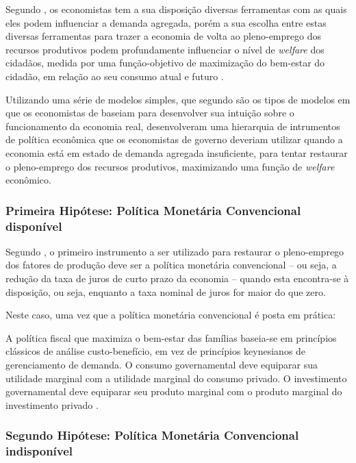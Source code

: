 \documentclass[
	10pt,				%
	openright,			%
	twoside,			%
	a5paper,			%
	english,			%
	french,				%
	spanish,			%
	brazil				%
	]{abntex2}
\renewenvironment{quote}
  {\small\list{}{\rightmargin=0.1cm \leftmargin=4cm}%
   \item\relax}
  {\endlist}
\begin{document}
Segundo , os economistas tem a sua
disposição diversas ferramentas com as quais eles podem influenciar a
demanda agregada, porém a sua escolha entre estas diversas ferramentas
para trazer a economia de volta ao pleno-emprego dos recursos produtivos
podem profundamente influenciar o nível de \emph{welfare} dos cidadãos,
medida por uma função-objetivo de maximização do bem-estar do cidadão,
em relação ao seu consumo atual e futuro \cite[p.~6]{mankiw2011}.

Utilizando uma série de modelos simples, que segundo
 são os tipos de modelos em que os
economistas de baseiam para desenvolver sua intuição sobre o
funcionamento da economia real, 
desenvolveram uma hierarquia de intrumentos de política econômica que os
economistas de governo deveriam utilizar quando a economia está em
estado de demanda agregada insuficiente, para tentar restaurar o
pleno-emprego dos recursos produtivos, maximizando uma função de
\emph{welfare} econômico.

\subsubsection{Primeira Hipótese: Política Monetária Convencional
disponível}\label{primeira-hipuxf3tese-poluxedtica-monetuxe1ria-convencional-disponuxedvel}

Segundo , o primeiro instrumento a ser
utilizado para restaurar o pleno-emprego dos fatores de produção deve
ser a política monetária convencional -- ou seja, a redução da taxa de
juros de curto prazo da economia -- quando esta encontra-se à
disposição, ou seja, enquanto a taxa nominal de juros for maior do que
zero.

Neste caso, uma vez que a política monetária convencional é posta em
prática:

\begin{quote}
A política fiscal que maximiza o bem-estar das famílias baseia-se em
princípios clássicos de análise custo-benefício, em vez de princípios
keynesianos de gerenciamento de demanda. O consumo governamental deve
equiparar sua utilidade marginal com a utilidade marginal do consumo
privado. O investimento governamental deve equiparar seu produto
marginal com o produto marginal do investimento privado
\cite[p.~32]{mankiw2011}.
\end{quote}

\subsubsection{Segundo Hipótese: Política Monetária Convencional
indisponível}\label{segundo-hipuxf3tese-poluxedtica-monetuxe1ria-convencional-indisponuxedvel}
\end{document}

